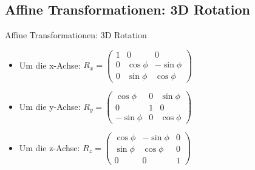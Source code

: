 \documentclass[10pt,aspectratio=169]{beamer}
\begin{document}
  \subsection{Affine Transformationen: 3D Rotation}
  \begin{frame}{Affine Transformationen: 3D Rotation}
    \begin{center}
    \begin{itemize}
      \item Um die x-Achse: \hspace{0.1cm}
      $R_x = \begin{pmatrix}
        1 & 0 & 0\\
        0 & \cos\phi & -\sin\phi\\
        0 & \sin\phi & \cos\phi
      \end{pmatrix}$\vspace{0.5cm}
      \item Um die y-Achse: \hspace{0.1cm}
      $R_y = \begin{pmatrix}
        \cos\phi & 0 & \sin\phi\\
        0 & 1 & 0\\
        -\sin\phi & 0 & \cos\phi
      \end{pmatrix}$\vspace{0.5cm}
      \item Um die z-Achse: \hspace{0.1cm}
      $R_z = \begin{pmatrix}
        \cos\phi & -\sin\phi & 0\\
        \sin\phi & \cos\phi & 0\\
        0 & 0 & 1
      \end{pmatrix}$
    \end{itemize}
  \end{center}
  \end{frame}
\end{document}
